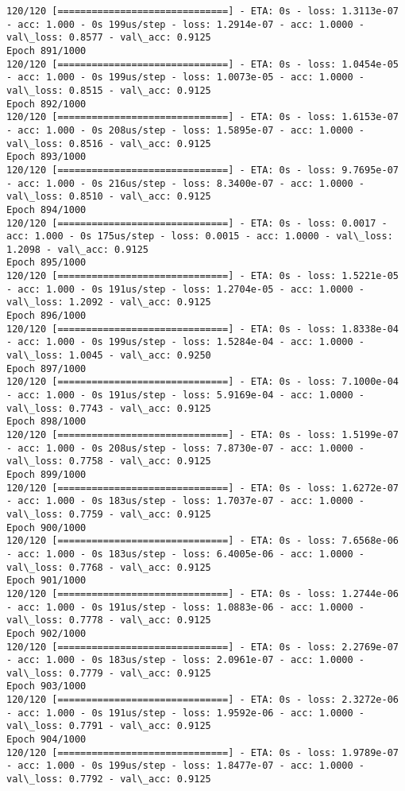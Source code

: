 \documentclass[11pt]{article}
\begin{document}
\begin{Verbatim}[commandchars=\\\{\}]
120/120 [==============================] - ETA: 0s - loss: 1.3113e-07 - acc: 1.000 - 0s 199us/step - loss: 1.2914e-07 - acc: 1.0000 - val\_loss: 0.8577 - val\_acc: 0.9125
Epoch 891/1000
120/120 [==============================] - ETA: 0s - loss: 1.0454e-05 - acc: 1.000 - 0s 199us/step - loss: 1.0073e-05 - acc: 1.0000 - val\_loss: 0.8515 - val\_acc: 0.9125
Epoch 892/1000
120/120 [==============================] - ETA: 0s - loss: 1.6153e-07 - acc: 1.000 - 0s 208us/step - loss: 1.5895e-07 - acc: 1.0000 - val\_loss: 0.8516 - val\_acc: 0.9125
Epoch 893/1000
120/120 [==============================] - ETA: 0s - loss: 9.7695e-07 - acc: 1.000 - 0s 216us/step - loss: 8.3400e-07 - acc: 1.0000 - val\_loss: 0.8510 - val\_acc: 0.9125
Epoch 894/1000
120/120 [==============================] - ETA: 0s - loss: 0.0017 - acc: 1.000 - 0s 175us/step - loss: 0.0015 - acc: 1.0000 - val\_loss: 1.2098 - val\_acc: 0.9125
Epoch 895/1000
120/120 [==============================] - ETA: 0s - loss: 1.5221e-05 - acc: 1.000 - 0s 191us/step - loss: 1.2704e-05 - acc: 1.0000 - val\_loss: 1.2092 - val\_acc: 0.9125
Epoch 896/1000
120/120 [==============================] - ETA: 0s - loss: 1.8338e-04 - acc: 1.000 - 0s 199us/step - loss: 1.5284e-04 - acc: 1.0000 - val\_loss: 1.0045 - val\_acc: 0.9250
Epoch 897/1000
120/120 [==============================] - ETA: 0s - loss: 7.1000e-04 - acc: 1.000 - 0s 191us/step - loss: 5.9169e-04 - acc: 1.0000 - val\_loss: 0.7743 - val\_acc: 0.9125
Epoch 898/1000
120/120 [==============================] - ETA: 0s - loss: 1.5199e-07 - acc: 1.000 - 0s 208us/step - loss: 7.8730e-07 - acc: 1.0000 - val\_loss: 0.7758 - val\_acc: 0.9125
Epoch 899/1000
120/120 [==============================] - ETA: 0s - loss: 1.6272e-07 - acc: 1.000 - 0s 183us/step - loss: 1.7037e-07 - acc: 1.0000 - val\_loss: 0.7759 - val\_acc: 0.9125
Epoch 900/1000
120/120 [==============================] - ETA: 0s - loss: 7.6568e-06 - acc: 1.000 - 0s 183us/step - loss: 6.4005e-06 - acc: 1.0000 - val\_loss: 0.7768 - val\_acc: 0.9125
Epoch 901/1000
120/120 [==============================] - ETA: 0s - loss: 1.2744e-06 - acc: 1.000 - 0s 191us/step - loss: 1.0883e-06 - acc: 1.0000 - val\_loss: 0.7778 - val\_acc: 0.9125
Epoch 902/1000
120/120 [==============================] - ETA: 0s - loss: 2.2769e-07 - acc: 1.000 - 0s 183us/step - loss: 2.0961e-07 - acc: 1.0000 - val\_loss: 0.7779 - val\_acc: 0.9125
Epoch 903/1000
120/120 [==============================] - ETA: 0s - loss: 2.3272e-06 - acc: 1.000 - 0s 191us/step - loss: 1.9592e-06 - acc: 1.0000 - val\_loss: 0.7791 - val\_acc: 0.9125
Epoch 904/1000
120/120 [==============================] - ETA: 0s - loss: 1.9789e-07 - acc: 1.000 - 0s 199us/step - loss: 1.8477e-07 - acc: 1.0000 - val\_loss: 0.7792 - val\_acc: 0.9125

\end{Verbatim}
\end{document}

